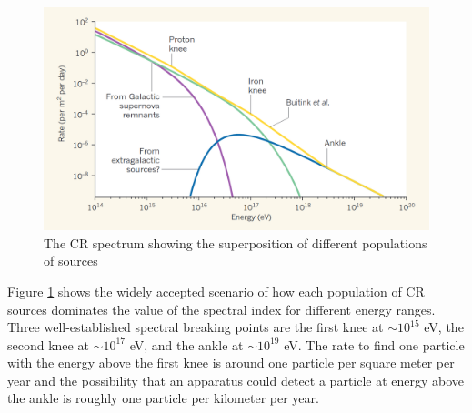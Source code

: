 \begin{figure}[h!]
    \centering
    \includegraphics[width=\textwidth]{content/background/figures/andrew_superposition.png}
    \caption{
        The CR spectrum showing the superposition of different
        populations of sources
        \citep{taylor2016_crspectrumsuperposition}
    }
    \label{fig:cr_superposition}
\end{figure}

Figure \ref{fig:cr_superposition} shows the widely accepted
scenario of how each population of CR sources dominates the
value of the spectral index for different energy ranges.
Three well-established spectral breaking points are the first knee
at $\sim10^15$ eV, the second knee at $\sim10^17$ eV,
and the ankle at $\sim10^19$ eV.
The rate to find one particle with the energy above the first knee
is around one particle per square meter per year and 
the possibility that an apparatus could detect
a particle at energy above the ankle is roughly one particle per 
kilometer per year.


